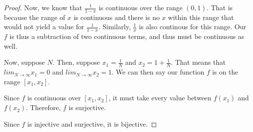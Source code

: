 \documentclass[11pt,reqno,oneside,a4paper]{article}
\begin{document}
\begin{proof}
Now, we know that $\frac{1}{1-x}$ is continuous over the range $(0,1)$. That is because the range of $x$ is continuous and there is no $x$ within this range that would not yield a value for $\frac{1}{1-x}$. Similarly, $\frac{1}{x}$ is also continous for this range. Our $f$ is thus a subtraction of two continuous terms, and thus must be continuous as well.

Now, suppose $N$. Then, suppose $x_1 = \frac{1}{N}$ and $x_2 = 1 + \frac{1}{N}$. That means that $lim_{N\to\infty} x_1 = 0$ and $lim_{N\to\infty} x_2 = 1$. We can then say our function $f$ is on the range $[x_1, x_2]$. 

Since $f$ is continuous over $[x_1, x_2]$, it must take every value between $f(x_1)$ and $f(x_2)$. Therefore, $f$ is surjective.

Since $f$ is injective and surjective, it is bijective.

\end{proof}
\end{document}
